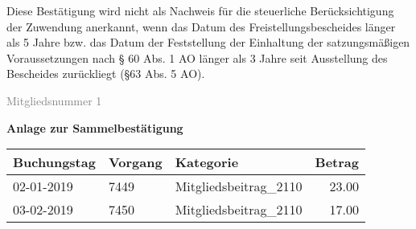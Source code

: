 \documentclass[11pt,ngerman]{scrartcl}
\begin{document}
Diese Bestätigung wird nicht als Nachweis für die steuerliche Berücksichtigung der Zuwendung anerkannt, wenn das Datum des Freistellungsbescheides länger als 5 Jahre bzw. das Datum der Feststellung der Einhaltung der satzungsmäßigen Voraussetzungen nach § 60 Abs. 1 AO länger als 3 Jahre seit Ausstellung des Bescheides zurückliegt (§63 Abs. 5 AO). 

\vfill \footnotesize{\textcolor{gray}{Mitgliedsnummer 1}}

\clearpage

{\bfseries\large Anlage zur Sammelbestätigung} \vspace*{2em}


\begin{tabular}{lllr}
\toprule
Buchungstag & Vorgang &              Kategorie &  Betrag \\
\midrule
 02-01-2019 &    7449 &  Mitgliedsbeitrag\_2110 &   23.00 \\
 03-02-2019 &    7450 &  Mitgliedsbeitrag\_2110 &   17.00 \\
\bottomrule
\end{tabular}
\end{document}

